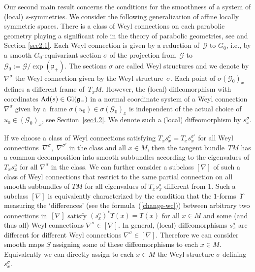 \documentclass[pdftex]{sigma}
\newcommand{\si}{\sigma}
\newcommand{\un}{\underline}
\newcommand{\ba}{\mathcal{G}}
\newcommand{\fg}{\mathfrak g}
\newcommand{\fp}{\mathfrak p}
\newcommand{\Ad}{{\rm Ad}}
\newcommand{\U}{\Upsilon}
\numberwithin{equation}{section}
\begin{document}
Our second main result concerns the conditions for the smoothness of a system of (local) $s$-symmetries. We consider the following generalization of af\/f\/ine locally symmetric spaces. There is a class of Weyl connections on each parabolic geometry playing a signif\/icant role in the theory of parabolic geometries, see \cite[Chapter 5]{parabook} and Section \ref{sec2.1}. Each Weyl connection is given by a reduction of~$\ba$ to $G_0$, i.e., by a smooth $G_0$-equivariant section $\si$ of the projection from~$\ba$ to~$\ba_0:=\ba/\exp(\fp_+)$. The sections $\si$ are called Weyl structures and we denote by $\nabla^\si$ the Weyl connection given by the Weyl structure~$\si$. Each point of $\si(\ba_0)_x$ def\/ines a dif\/ferent frame of~$T_xM$. However, the (local) dif\/feomorphism with coordinates $\Ad(s)\in {\rm Gl}(\fg_-)$ in a normal coordinate system of a Weyl connection~$\nabla^\si$ given by a~frame $\si(u_0)\in \si(\ba_0)_x$ is independent of the actual choice of $u_0\in (\ba_0)_x$, see Section~\ref{sec4.2}. We denote such a (local) dif\/feomorphism by $s_x^\si$.

If we choose a class of Weyl connections satisfying $T_xs_x^\si=T_xs_x^{\si'}$ for all Weyl connec\-tions~$\nabla^\si$,~$\nabla^{\si'}$ in the class and all $x\in M$, then the tangent bundle~$TM$ has a common decomposition into smooth subbundles according to the eigenvalues of $T_xs_x^\si$ for all $\nabla^\si$ in the class. We can further consider a subclass $[\nabla]$ of such a class of Weyl connections that restrict to the same partial connection on all smooth subbundles of $TM$ for all eigenvalues of $T_xs_x^\si$ dif\/ferent from $1$. Such a subclass $[\nabla]$ is equivalently characterized by the condition that the $1$-forms~$\U$ measuring the `dif\/ferences' (see the formula~(\ref{change-wc})) between arbitrary two connections in~$[\nabla]$ satisfy $(s_x^\si)^*\U(x)=\U(x)$ for all $x\in M$ and some (and thus all) Weyl connections $\nabla^\si\in [\nabla]$. In general, (local) dif\/feomorphisms $s_x^\si$ are dif\/ferent for dif\/ferent Weyl connections $\nabla^\si\in [\nabla]$. Therefore we can consider smooth maps $\un S$ assigning some of these dif\/feomorphisms to each $x\in M$. Equivalently we can directly assign to each $x\in M$ the Weyl structure $\si$ def\/ining $s_x^\si$.
\end{document}
